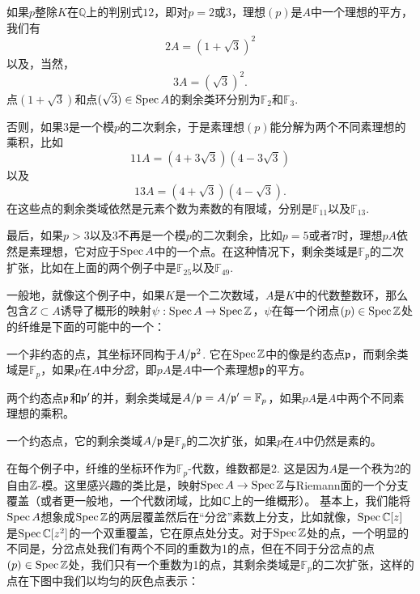 \begin{compactenum}[(1)]
	\item 如果$p$整除$K$在$\mathbb{Q}$上的判别式$12$，即对$p=2$或$3$，理想$(p)$是$A$中一个理想的平方，我们有
	\[
	2A=(1+\sqrt{3})^2
	\]
	以及，当然，
	\[
	3A=(\sqrt{3})^2.
	\]
	点$(1+\sqrt{3})$和点$(\sqrt{3})\in\operatorname{Spec} A$的剩余类环分别为$\mathbb{F}_2$和$\mathbb{F}_3$.

	\item 否则，如果$3$是一个模$p$的二次剩余，于是素理想$(p)$能分解为两个不同素理想的乘积，比如
	\[
	11A=(4+3\sqrt{3})(4-3\sqrt{3})
	\]
	以及
	\[
	13A=(4+\sqrt{3})(4-\sqrt{3}).
	\]
	在这些点的剩余类域依然是元素个数为素数的有限域，分别是$\mathbb{F}_{11}$以及$\mathbb{F}_{13}$.

	\item 最后，如果$p>3$以及$3$不再是一个模$p$的二次剩余，比如$p=5$或者$7$时，理想$pA$依然是素理想，它对应于$\operatorname{Spec} A$中的一个点。在这种情况下，剩余类域是$\mathbb{F}_p$的二次扩张，比如在上面的两个例子中是$\mathbb{F}_{25}$以及$\mathbb{F}_{49}$.
\end{compactenum}

一般地，就像这个例子中，如果$K$是一个二次数域，$A$是$K$中的代数整数环，那么包含$Z\subset A$诱导了概形的映射$\psi:\operatorname{Spec} A\to \operatorname{Spec} \mathbb{Z}$，$\psi$在每一个闭点$(p)\in \operatorname{Spec} \mathbb{Z}$处的纤维是下面的可能中的一个：

\begin{compactenum}[(1)]
	\item 一个非约态的点，其坐标环同构于$A/\mathfrak{p}^2$. 它在$\operatorname{Spec} \mathbb{Z}$中的像是约态点$\mathfrak{p}$，而剩余类域是$\mathbb{F}_p$，如果$p$在$A$中\textit{分岔}，即$pA$是$A$中一个素理想$\mathfrak{p}$的平方。

	\item 两个约态点$\mathfrak{p}$和$\mathfrak{p}'$的并，剩余类域是$A/\mathfrak{p}=A/\mathfrak{p}'=\mathbb{F}_p$，如果$pA$是$A$中两个不同素理想的乘积。

	\item 一个约态点，它的剩余类域$A/\mathfrak{p}$是$\mathbb{F}_p$的二次扩张，如果$p$在$A$中仍然是素的。
\end{compactenum}

在每个例子中，纤维的坐标环作为$\mathbb{F}_p$-代数，维数都是2. 这是因为$A$是一个秩为2的自由$\mathbb{Z}$-模。这里感兴趣的类比是，映射$\operatorname{Spec} A\to \operatorname{Spec} \mathbb{Z}$与Riemann面的一个分支覆盖（或者更一般地，一个代数闭域，比如$\mathbb{C}$上的一维概形）。 基本上，我们能将$\operatorname{Spec} A$想象成$\operatorname{Spec} \mathbb{Z}$的两层覆盖然后在“分岔”素数上分支，比如就像，$\operatorname{Spec} \mathbb{C}[z]$是$\operatorname{Spec} \mathbb{C}[z^2]$的一个双重覆盖，它在原点处分支。对于$\operatorname{Spec} \mathbb{Z}$处的点，一个明显的不同是，分岔点处我们有两个不同的重数为1的点，但在不同于分岔点的点$(p)\in \operatorname{Spec} \mathbb{Z}$处，我们只有一个重数为1的点，其剩余类域是$\mathbb{F}_p$的二次扩张，这样的点在下图中我们以均匀的灰色点表示：

